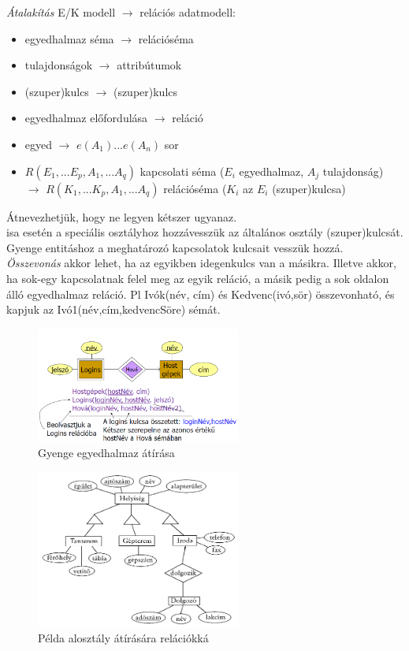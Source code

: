 \documentclass[margin=0px]{article}
\begin{document}
	\textit{Átalakítás} E/K modell $\to$ relációs adatmodell:
	\begin{itemize}
		\item egyedhalmaz séma $\to$ relációséma
		\item tulajdonságok $\to$ attribútumok
		\item (szuper)kulcs $\to$ (szuper)kulcs
		\item egyedhalmaz előfordulása $\to$ reláció
		\item egyed $\to$ $e(A_1)...e(A_n)$ sor
		\item $R(E_1,...E_p, A_1,...A_q)$ kapcsolati séma ($E_i$ egyedhalmaz, $A_j$ tulajdonság) $\to$ $R(K_1,...K_p, A_1,...A_q)$ relációséma ($K_i$ az $E_i$ (szuper)kulcsa)
	\end{itemize}
	Átnevezhetjük, hogy ne legyen kétszer ugyanaz. \\
	isa esetén a speciális osztályhoz hozzávesszük az általános osztály (szuper)kulcsát. Gyenge entitáshoz a meghatározó kapcsolatok kulcsait vesszük hozzá. \\
	\textit{Összevonás} akkor lehet, ha az egyikben idegenkulcs van a másikra. Illetve akkor, ha sok-egy kapcsolatnak felel meg az egyik reláció, a másik pedig a sok oldalon álló egyedhalmaz reláció. Pl Ivók(név, cím) és Kedvenc(ivó,sör) összevonható, és kapjuk az Ivó1(név,cím,kedvencSöre) sémát. \\
	\begin{figure}[H]
		\centering
		\includegraphics[width=0.6\textwidth]{img/ek8.png}
		\caption{Gyenge egyedhalmaz átírása}
	\end{figure}
	\begin{figure}[H]
		\centering
		\includegraphics[width=0.6\textwidth]{img/ek9.png}
		\caption{Példa alosztály átírására relációkká}
	\end{figure}
\end{document}
